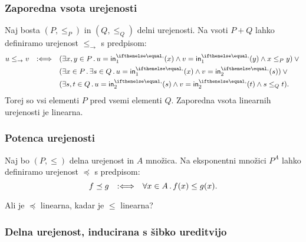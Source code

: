 \subsubsection{Zaporedna vsota urejenosti}

Naj bosta $(P, \leq_P)$ in $(Q, \leq_Q)$ delni urejenosti. Na vsoti $P + Q$ lahko definiramo urejenost $\leq_{\to}$ s predpisom:
%
\begin{equation*}
  u \leq_{\to} v \defiff
  \begin{aligned}[t]
    &(\some{x, y \in P} u = \inl(x) \land v = \inl(y) \land x \leq_P y) \lor {} \\
    &(\some{x \in P} \some{s \in Q} u = \inl(x) \land v = \inr(s)) \lor {} \\
    &(\some{s, t \in Q} u = \inr(s) \land v = \inr(t) \land s \leq_Q t).
  \end{aligned}
\end{equation*}
%
Torej so vsi elementi $P$ pred vsemi elementi $Q$. Zaporedna vsota linearnih urejenosti je linearna.


\subsubsection{Potenca urejenosti}

Naj bo $(P, \leq)$ delna urejenost in $A$ množica. Na eksponentni množici $P^A$ lahko definiramo urejenost $\preceq$ s predpisom:
%
\begin{equation*}
  f \preceq g \quad {{:}{\Longleftrightarrow}}\quad \forall x \in A \,.\, f(x) \leq g(x).
\end{equation*}

\begin{vaja}
  Ali je $\preceq$ linearna, kadar je $\leq$ linearna?
\end{vaja}


\subsubsection{Delna urejenost, inducirana s šibko ureditvijo}

